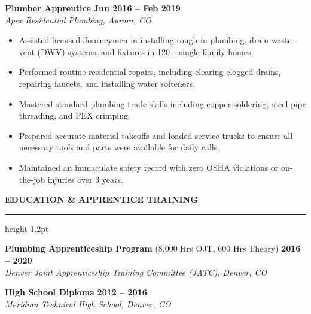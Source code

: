 \documentclass[10pt]{article}
\newcommand{\resumesection}[2]{%
  \vspace{6pt}
  \noindent
  {\color{primary}\large\bfseries #1\quad \MakeUppercase{#2}}
  \vspace{1pt}
  {\color{secondary}\hrule height 1.2pt}
  \vspace{3pt}
}
\begin{document}
\noindent
\textbf{Plumber Apprentice} \hfill \textbf{Jun 2016 -- Feb 2019} \\
\textit{Apex Residential Plumbing, Aurora, CO} \\
\vspace{-4pt}
\begin{itemize}
  \item Assisted licensed Journeymen in installing rough-in plumbing, drain-waste-vent (DWV) systems, and fixtures in 120+ single-family homes.
  \item Performed routine residential repairs, including clearing clogged drains, repairing faucets, and installing water softeners.
  \item Mastered standard plumbing trade skills including copper soldering, steel pipe threading, and PEX crimping.
  \item Prepared accurate material takeoffs and loaded service trucks to ensure all necessary tools and parts were available for daily calls.
  \item Maintained an immaculate safety record with zero OSHA violations or on-the-job injuries over 3 years.
\end{itemize}
\vspace{4pt}

\resumesection{\faGraduationCap}{Education \& Apprentice Training}

\noindent
\textbf{Plumbing Apprenticeship Program} (8,000 Hrs OJT, 600 Hrs Theory) \hfill \textbf{2016 -- 2020} \\
\textit{Denver Joint Apprenticeship Training Committee (JATC), Denver, CO} \\
\vspace{2pt}

\noindent
\textbf{High School Diploma} \hfill \textbf{2012 -- 2016} \\
\textit{Meridian Technical High School, Denver, CO}
\end{document}
